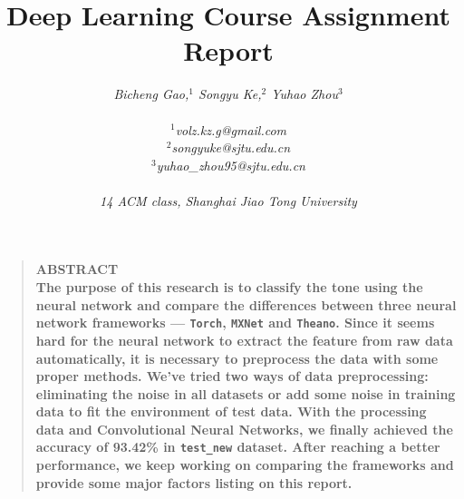 \documentclass[12pt]{article}
\title{{\bf Deep Learning Course Assignment Report}}
\author
{{\it Bicheng Gao,$^{1}$ Songyu Ke,$^{2}$ Yuhao Zhou$^{3}$}\\
\\
\normalsize{{\it $^{1}$volz.kz.g@gmail.com}}\\
\normalsize{{\it $^{2}$songyuke@sjtu.edu.cn}}\\
\normalsize{{\it $^{3}$yuhao\_zhou95@sjtu.edu.cn}}\\
\\
\normalsize{{\it 14 ACM class, Shanghai Jiao Tong University}}
}
\date{}
\newenvironment{sciabstract}{%
\begin{quote} \bf}
{\end{quote}}
\begin{document}
 


\baselineskip24pt


\maketitle 




\begin{sciabstract}
{\bf ABSTRACT} \\
The purpose of this research is to classify the tone using the neural network and compare the differences between three neural network frameworks --- \texttt{Torch}, \texttt{MXNet} and \texttt{Theano}. Since it seems hard for the neural network to extract the feature from raw data automatically, it is necessary to preprocess the data with some proper methods. We've tried two ways of data preprocessing: eliminating the noise in all datasets or add some noise in training data to fit the environment of test data. With the processing data and Convolutional Neural Networks, we finally achieved the accuracy of {93.42\%} in \texttt{test\_new} dataset. After reaching a better performance, we keep working on comparing the frameworks and provide some major factors listing on this report.
\end{sciabstract}

\end{document}
